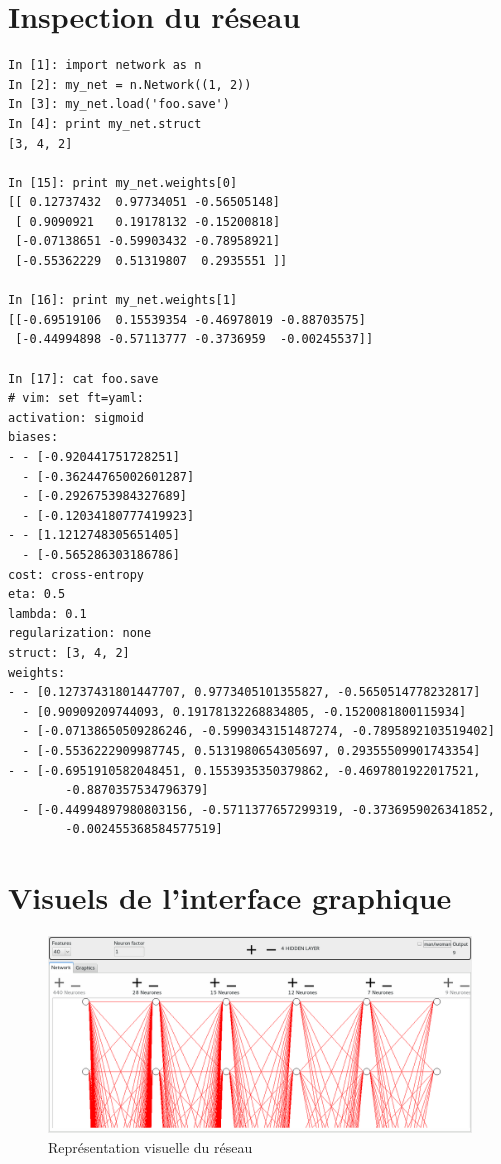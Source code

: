 \documentclass[11pt]{article}
\begin{document}
\section{Inspection du r\'eseau}
\label{inspect}
\begin{lstlisting}
In [1]: import network as n
In [2]: my_net = n.Network((1, 2))
In [3]: my_net.load('foo.save')
In [4]: print my_net.struct
[3, 4, 2]

In [15]: print my_net.weights[0]
[[ 0.12737432  0.97734051 -0.56505148]
 [ 0.9090921   0.19178132 -0.15200818]
 [-0.07138651 -0.59903432 -0.78958921]
 [-0.55362229  0.51319807  0.2935551 ]]

In [16]: print my_net.weights[1]
[[-0.69519106  0.15539354 -0.46978019 -0.88703575]
 [-0.44994898 -0.57113777 -0.3736959  -0.00245537]]

In [17]: cat foo.save
# vim: set ft=yaml:
activation: sigmoid
biases:
- - [-0.920441751728251]
  - [-0.36244765002601287]
  - [-0.2926753984327689]
  - [-0.12034180777419923]
- - [1.1212748305651405]
  - [-0.565286303186786]
cost: cross-entropy
eta: 0.5
lambda: 0.1
regularization: none
struct: [3, 4, 2]
weights:
- - [0.12737431801447707, 0.9773405101355827, -0.5650514778232817]
  - [0.90909209744093, 0.19178132268834805, -0.1520081800115934]
  - [-0.07138650509286246, -0.5990343151487274, -0.7895892103519402]
  - [-0.5536222909987745, 0.5131980654305697, 0.29355509901743354]
- - [-0.6951910582048451, 0.1553935350379862, -0.4697801922017521,
		-0.8870357534796379]
  - [-0.44994897980803156, -0.5711377657299319, -0.3736959026341852,
		-0.002455368584577519]
\end{lstlisting}

\section{Visuels de l'interface graphique} \label{gui}
\begin{figure}[htp]
	\centering
	\includegraphics[scale=.27]{img/NetworkGraphics.png}
	\caption{Repr\'esentation visuelle du r\'eseau}
	\label{guinet}
\end{figure}
\end{document}
